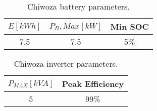 \begin{table}[!h]
    \centering
    \begin{tabular}{c|c|c}
         $E[kWh]$& $P_B,Max[kW]$ &Min SOC\\
         \hline
         7.5 & 7.5 & 5\%\\
    \end{tabular}
    \caption[Chiwoza battery parameters]{Chiwoza battery parameters.}
    \label{tab:chiwoza_bat_param}
\end{table}

\begin{table}[!h]
    \centering
    \begin{tabular}{c|c}
         $P_{MAX}[kVA]$& Peak Efficiency\\
         \hline
         5 & 99\%\\
    \end{tabular}
    \caption[Chiwoza inverter parameters]{Chiwoza inverter parameters.}
    \label{tab:chiwoza_inv_param}
\end{table}

